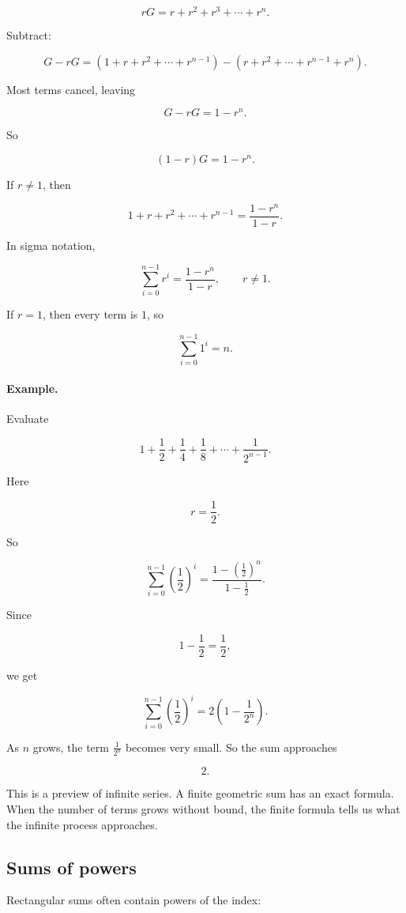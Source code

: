 \[
rG=r+r^2+r^3+\cdots+r^n.
\]

Subtract:

\[
G-rG
=
(1+r+r^2+\cdots+r^{n-1})
-
(r+r^2+\cdots+r^{n-1}+r^n).
\]

Most terms cancel, leaving

\[
G-rG=1-r^n.
\]

So

\[
(1-r)G=1-r^n.
\]

If \(r\neq1\), then

\[
\boxed{
1+r+r^2+\cdots+r^{n-1}
=
\frac{1-r^n}{1-r}.
}
\]

In sigma notation,

\[
\boxed{
\sum_{i=0}^{n-1} r^i
=
\frac{1-r^n}{1-r},
\qquad r\neq1.
}
\]

If \(r=1\), then every term is \(1\), so

\[
\sum_{i=0}^{n-1}1^i=n.
\]

\paragraph{Example.}
Evaluate

\[
1+\frac12+\frac14+\frac18+\cdots+\frac{1}{2^{n-1}}.
\]

Here

\[
r=\frac12.
\]

So

\[
\sum_{i=0}^{n-1}\left(\frac12\right)^i
=
\frac{1-\left(\frac12\right)^n}{1-\frac12}.
\]

Since

\[
1-\frac12=\frac12,
\]

we get

\[
\sum_{i=0}^{n-1}\left(\frac12\right)^i
=
2\left(1-\frac{1}{2^n}\right).
\]

As \(n\) grows, the term \(\frac{1}{2^n}\) becomes very small.  So the sum approaches

\[
2.
\]

This is a preview of infinite series.  A finite geometric sum has an exact formula.  When
the number of terms grows without bound, the finite formula tells us what the infinite
process approaches.

\subsection{Sums of powers}
\label{subsec:sums-of-powers}

Rectangular sums often contain powers of the index:

